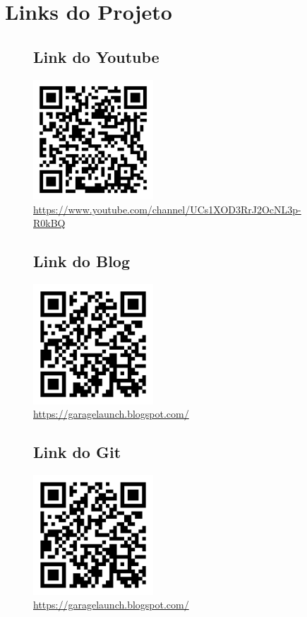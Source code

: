 \chapter{Links do Projeto}
\begin{figure}[htb]
	\section{Link do Youtube}
	\includegraphics[width=0.40\textwidth]{anexos/youtube.png} \\
	\hyperlink {Link Youtube}{https://www.youtube.com/channel/UCs1XOD3RrJ2OcNL3p-R0kBQ}
\end{figure}

\begin{figure}[htb]
	\section{Link do Blog}
	\includegraphics[width=0.40\textwidth]{anexos/blog.png} \\
	\hyperlink {Link do Blog}{https://garagelaunch.blogspot.com/}
\end{figure}

\begin{figure}[htb]
	\section{Link do Git}
	\includegraphics[width=0.40\textwidth]{anexos/blog.png} \\
	\hyperlink {Link do Blog}{https://garagelaunch.blogspot.com/}
\end{figure}

